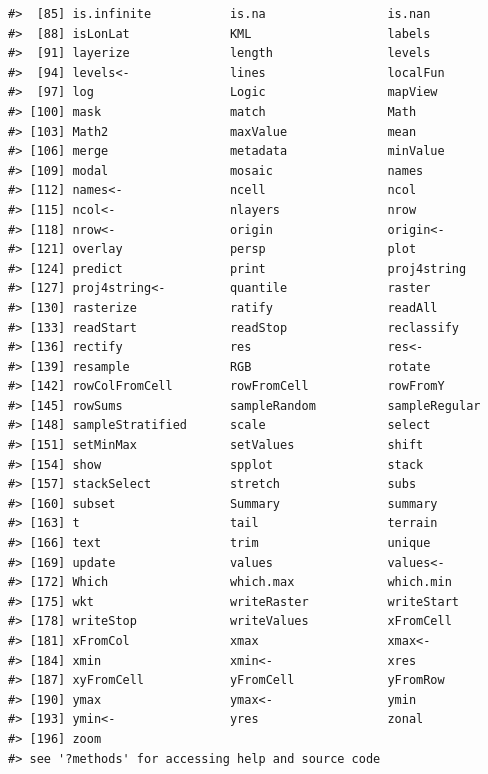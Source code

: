 \documentclass[
  11pt,
]{book}
\begin{document}
\begin{verbatim}
#>  [85] is.infinite           is.na                 is.nan               
#>  [88] isLonLat              KML                   labels               
#>  [91] layerize              length                levels               
#>  [94] levels<-              lines                 localFun             
#>  [97] log                   Logic                 mapView              
#> [100] mask                  match                 Math                 
#> [103] Math2                 maxValue              mean                 
#> [106] merge                 metadata              minValue             
#> [109] modal                 mosaic                names                
#> [112] names<-               ncell                 ncol                 
#> [115] ncol<-                nlayers               nrow                 
#> [118] nrow<-                origin                origin<-             
#> [121] overlay               persp                 plot                 
#> [124] predict               print                 proj4string          
#> [127] proj4string<-         quantile              raster               
#> [130] rasterize             ratify                readAll              
#> [133] readStart             readStop              reclassify           
#> [136] rectify               res                   res<-                
#> [139] resample              RGB                   rotate               
#> [142] rowColFromCell        rowFromCell           rowFromY             
#> [145] rowSums               sampleRandom          sampleRegular        
#> [148] sampleStratified      scale                 select               
#> [151] setMinMax             setValues             shift                
#> [154] show                  spplot                stack                
#> [157] stackSelect           stretch               subs                 
#> [160] subset                Summary               summary              
#> [163] t                     tail                  terrain              
#> [166] text                  trim                  unique               
#> [169] update                values                values<-             
#> [172] Which                 which.max             which.min            
#> [175] wkt                   writeRaster           writeStart           
#> [178] writeStop             writeValues           xFromCell            
#> [181] xFromCol              xmax                  xmax<-               
#> [184] xmin                  xmin<-                xres                 
#> [187] xyFromCell            yFromCell             yFromRow             
#> [190] ymax                  ymax<-                ymin                 
#> [193] ymin<-                yres                  zonal                
#> [196] zoom                 
#> see '?methods' for accessing help and source code
\end{verbatim}
\end{document}
